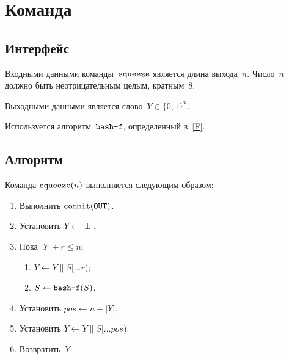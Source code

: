 \section{Команда }\label{PRG.Squeeze}

\subsection{Интерфейс}\label{PRG.Squeeze.IFace}

Входными данными команды~$\texttt{squeeze}$ является длина выхода~$n$.
Число~$n$ должно быть неотрицательным целым, кратным~$8$.

Выходными данными является слово~$Y\in\{0,1\}^n$.

Используется алгоритм~$\texttt{bash-f}$, определенный в~\ref{F}.

\subsection{Алгоритм}\label{PRG.Squeeze.Alg}

Команда $\texttt{squeeze}(n)$ выполняется следующим образом:
\begin{enumerate}
\item
Выполнить
$\texttt{commit}(\texttt{OUT})$.
\item
Установить
$Y\leftarrow\perp$.
\item
Пока $|Y|+r\leq n$:
\begin{enumerate}
\item
$Y\leftarrow Y\parallel S[\dots r)$;
\item
$S\leftarrow\texttt{bash-f}(S)$.
\end{enumerate}
\item
Установить
$pos\leftarrow n-|Y|$.
\item
Установить
$Y\leftarrow Y\parallel S[\dots pos)$.
\item
Возвратить~$Y$.
\end{enumerate}

